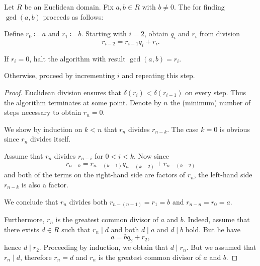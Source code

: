 \begin{algorithm}\label{alg:euclidean_algorithm}
  Let \( R \) be an Euclidean domain. Fix \( a, b \in R \) with \( b \neq 0 \). The  for finding \( \gcd(a, b) \) proceeds as follows:
  \begin{algenum}
     Define \( r_0 \coloneqq a \) and \( r_1 \coloneqq b \).
     Starting with \( i = 2 \), obtain \( q_i \) and \( r_i \) from division
    \begin{equation*}
      r_{i-2} = r_{i-1} q_i + r_i.
    \end{equation*}

    If \( r_i = 0 \), halt the algorithm with result \( \gcd(a, b) = r_i \).

    Otherwise, proceed by incrementing \( i \) and repeating this step.
  \end{algenum}
\end{algorithm}
\begin{proof}
  Euclidean division ensures that \( \delta(r_i) < \delta(r_{i-1}) \) on every step. Thus the algorithm terminates at some point. Denote by \( n \) the (minimum) number of steps necessary to obtain \( r_n = 0 \).

  We show by induction on \( k < n \) that \( r_n \) divides \( r_{n-k} \). The case \( k = 0 \) is obvious since \( r_n \) divides itself.

  Assume that \( r_n \) divides \( r_{n-i} \) for \( 0 < i < k \). Now since
  \begin{equation*}
    r_{n-k} = r_{n-(k-1)} q_{n-(k-2)} + r_{n-(k-2)}
  \end{equation*}
  and both of the terms on the right-hand side are factors of \( r_n \), the left-hand side \( r_{n-k} \) is also a factor.

  We conclude that \( r_n \) divides both \( r_{n-(n-1)} = r_1 = b \) and \( r_{n-n} = r_0 = a \).

  Furthermore, \( r_n \) is the greatest common divisor of \( a \) and \( b \). Indeed, assume that there exists \( d \in R \) such that \( r_n \mid d \) and both \( d \mid a \) and \( d \mid b \) hold. But he have
  \begin{equation*}
    a = b q_2 + r_2,
  \end{equation*}
  hence \( d \mid r_2 \). Proceeding by induction, we obtain that \( d \mid r_n \). But we assumed that \( r_n \mid d \), therefore \( r_n = d \) and \( r_n \) is the greatest common divisor of \( a \) and \( b \).
\end{proof}

